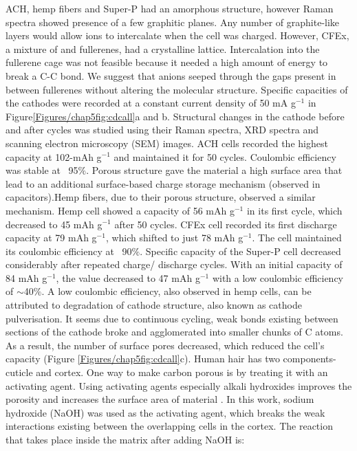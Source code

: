 ACH, hemp fibers and Super-P had an amorphous structure, however Raman spectra showed presence of a few graphitic planes. Any number of graphite-like layers would allow  ions to intercalate when the cell was charged. However, CFEx, a mixture of  and  fullerenes, had a crystalline lattice. Intercalation into the fullerene cage was not feasible because it needed a high amount of energy to break a C-C bond. We suggest that  anions seeped through the gaps present in between fullerenes without altering the molecular structure. Specific capacities of the cathodes were recorded at a constant current density of 50 mA g$^{-1}$ in Figure\ref{Figures/chap5fig:cdcall}a and b. Structural changes in the cathode before and after cycles was studied using their Raman spectra, XRD spectra and scanning electron microscopy (SEM) images.
ACH cells recorded the highest capacity at 102-mAh g$^{-1}$ and maintained it for 50 cycles. Coulombic efficiency was stable at ~95$\%$. Porous structure gave the material a high surface area that lead to an additional surface-based charge storage mechanism (observed in capacitors).Hemp fibers, due to their porous structure, observed a similar mechanism. Hemp cell showed a capacity of 56 mAh g$^{-1}$ in its first cycle, which decreased to 45 mAh g$^{-1}$ after 50 cycles. CFEx cell recorded its first discharge capacity at 79 mAh g$^{-1}$, which shifted to just 78 mAh g$^{-1}$. The cell maintained its coulombic efficiency at ~90$\%$. Specific capacity of the Super-P cell decreased considerably after repeated charge/ discharge cycles. With an initial capacity of 84 mAh g$^{-1}$, the value decreased to 47 mAh g$^{-1}$ with a low coulombic efficiency of $\sim$40$\%$. A low coulombic efficiency, also observed in hemp cells, can be attributed to degradation of cathode structure, also known as cathode pulverisation. It seems due to continuous cycling, weak bonds existing between sections of the cathode broke and agglomerated into smaller chunks of C atoms. As a result, the number of surface pores decreased, which reduced the cell's capacity (Figure \ref{Figures/chap5fig:cdcall}c). 
Human hair has two components- cuticle and cortex. One way to make carbon porous is by treating it with an activating agent. Using activating agents especially alkali hydroxides improves the porosity and increases the surface area of material \cite{liu_hair-based_2017} .
In this work, sodium hydroxide (NaOH) was used as the activating agent, which breaks the weak interactions existing between the overlapping cells in the cortex. The reaction that takes place inside the matrix after adding NaOH is:


